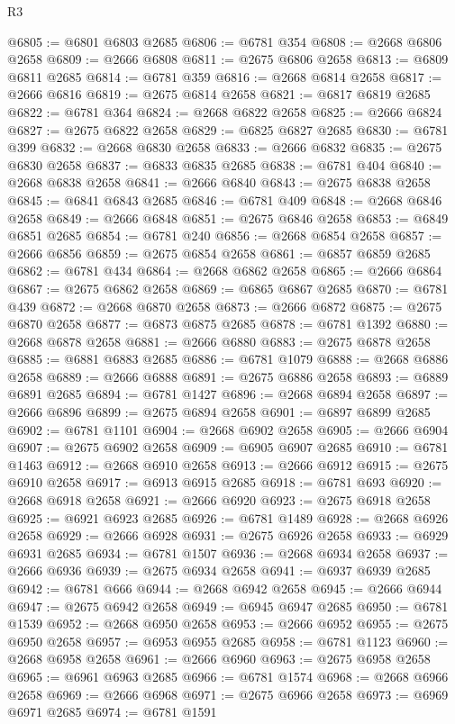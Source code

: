 \begin{lexlean}{R3}
\begin{coremodule}
@6805 := @6801 @6803 @2685
@6806 := @6781 @354
@6808 := @2668 @6806 @2658
@6809 := @2666 @6808
@6811 := @2675 @6806 @2658
@6813 := @6809 @6811 @2685
@6814 := @6781 @359
@6816 := @2668 @6814 @2658
@6817 := @2666 @6816
@6819 := @2675 @6814 @2658
@6821 := @6817 @6819 @2685
@6822 := @6781 @364
@6824 := @2668 @6822 @2658
@6825 := @2666 @6824
@6827 := @2675 @6822 @2658
@6829 := @6825 @6827 @2685
@6830 := @6781 @399
@6832 := @2668 @6830 @2658
@6833 := @2666 @6832
@6835 := @2675 @6830 @2658
@6837 := @6833 @6835 @2685
@6838 := @6781 @404
@6840 := @2668 @6838 @2658
@6841 := @2666 @6840
@6843 := @2675 @6838 @2658
@6845 := @6841 @6843 @2685
@6846 := @6781 @409
@6848 := @2668 @6846 @2658
@6849 := @2666 @6848
@6851 := @2675 @6846 @2658
@6853 := @6849 @6851 @2685
@6854 := @6781 @240
@6856 := @2668 @6854 @2658
@6857 := @2666 @6856
@6859 := @2675 @6854 @2658
@6861 := @6857 @6859 @2685
@6862 := @6781 @434
@6864 := @2668 @6862 @2658
@6865 := @2666 @6864
@6867 := @2675 @6862 @2658
@6869 := @6865 @6867 @2685
@6870 := @6781 @439
@6872 := @2668 @6870 @2658
@6873 := @2666 @6872
@6875 := @2675 @6870 @2658
@6877 := @6873 @6875 @2685
@6878 := @6781 @1392
@6880 := @2668 @6878 @2658
@6881 := @2666 @6880
@6883 := @2675 @6878 @2658
@6885 := @6881 @6883 @2685
@6886 := @6781 @1079
@6888 := @2668 @6886 @2658
@6889 := @2666 @6888
@6891 := @2675 @6886 @2658
@6893 := @6889 @6891 @2685
@6894 := @6781 @1427
@6896 := @2668 @6894 @2658
@6897 := @2666 @6896
@6899 := @2675 @6894 @2658
@6901 := @6897 @6899 @2685
@6902 := @6781 @1101
@6904 := @2668 @6902 @2658
@6905 := @2666 @6904
@6907 := @2675 @6902 @2658
@6909 := @6905 @6907 @2685
@6910 := @6781 @1463
@6912 := @2668 @6910 @2658
@6913 := @2666 @6912
@6915 := @2675 @6910 @2658
@6917 := @6913 @6915 @2685
@6918 := @6781 @693
@6920 := @2668 @6918 @2658
@6921 := @2666 @6920
@6923 := @2675 @6918 @2658
@6925 := @6921 @6923 @2685
@6926 := @6781 @1489
@6928 := @2668 @6926 @2658
@6929 := @2666 @6928
@6931 := @2675 @6926 @2658
@6933 := @6929 @6931 @2685
@6934 := @6781 @1507
@6936 := @2668 @6934 @2658
@6937 := @2666 @6936
@6939 := @2675 @6934 @2658
@6941 := @6937 @6939 @2685
@6942 := @6781 @666
@6944 := @2668 @6942 @2658
@6945 := @2666 @6944
@6947 := @2675 @6942 @2658
@6949 := @6945 @6947 @2685
@6950 := @6781 @1539
@6952 := @2668 @6950 @2658
@6953 := @2666 @6952
@6955 := @2675 @6950 @2658
@6957 := @6953 @6955 @2685
@6958 := @6781 @1123
@6960 := @2668 @6958 @2658
@6961 := @2666 @6960
@6963 := @2675 @6958 @2658
@6965 := @6961 @6963 @2685
@6966 := @6781 @1574
@6968 := @2668 @6966 @2658
@6969 := @2666 @6968
@6971 := @2675 @6966 @2658
@6973 := @6969 @6971 @2685
@6974 := @6781 @1591

\end{coremodule}
\end{lexlean}
